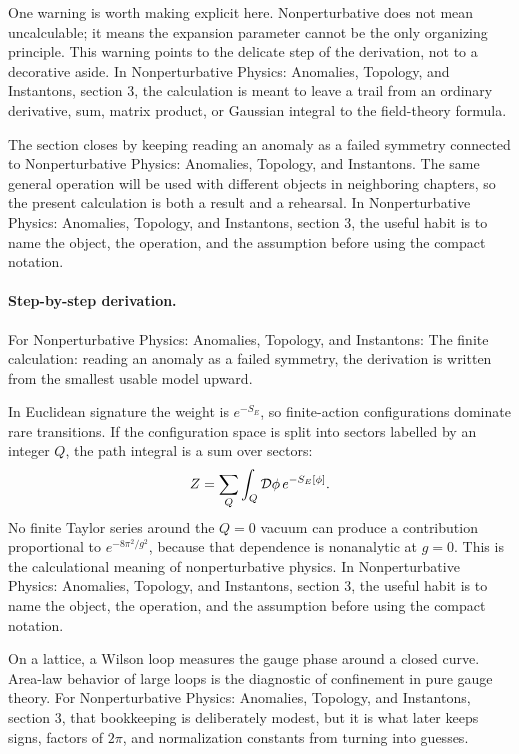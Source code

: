 One warning is worth making explicit here.  Nonperturbative does not mean uncalculable; it means the expansion parameter cannot be the only organizing principle.  This warning points to the delicate step of the derivation, not to a decorative aside.  In Nonperturbative Physics: Anomalies, Topology, and Instantons, section 3, the calculation is meant to leave a trail from an ordinary derivative, sum, matrix product, or Gaussian integral to the field-theory formula.

The section closes by keeping reading an anomaly as a failed symmetry connected to Nonperturbative Physics: Anomalies, Topology, and Instantons.  The same general operation will be used with different objects in neighboring chapters, so the present calculation is both a result and a rehearsal.  In Nonperturbative Physics: Anomalies, Topology, and Instantons, section 3, the useful habit is to name the object, the operation, and the assumption before using the compact notation.



\paragraph{Step-by-step derivation.}

For Nonperturbative Physics: Anomalies, Topology, and Instantons: The finite calculation: reading an anomaly as a failed symmetry, the derivation is written from the smallest usable model upward.

In Euclidean signature the weight is \(e^{-S_E}\), so finite-action configurations dominate rare transitions.  If the configuration space is split into sectors labelled by an integer \(Q\), the path integral is a sum over sectors:
\[
  Z=\sum_Q\int_Q\mathcal D\phi\,e^{-S_E[\phi]}.
\]
No finite Taylor series around the \(Q=0\) vacuum can produce a contribution proportional to \(e^{-8\pi^2/g^2}\), because that dependence is nonanalytic at \(g=0\).  This is the calculational meaning of nonperturbative physics.  In Nonperturbative Physics: Anomalies, Topology, and Instantons, section 3, the useful habit is to name the object, the operation, and the assumption before using the compact notation.

On a lattice, a Wilson loop measures the gauge phase around a closed curve.  Area-law behavior of large loops is the diagnostic of confinement in pure gauge theory.  For Nonperturbative Physics: Anomalies, Topology, and Instantons, section 3, that bookkeeping is deliberately modest, but it is what later keeps signs, factors of \(2\pi\), and normalization constants from turning into guesses.

